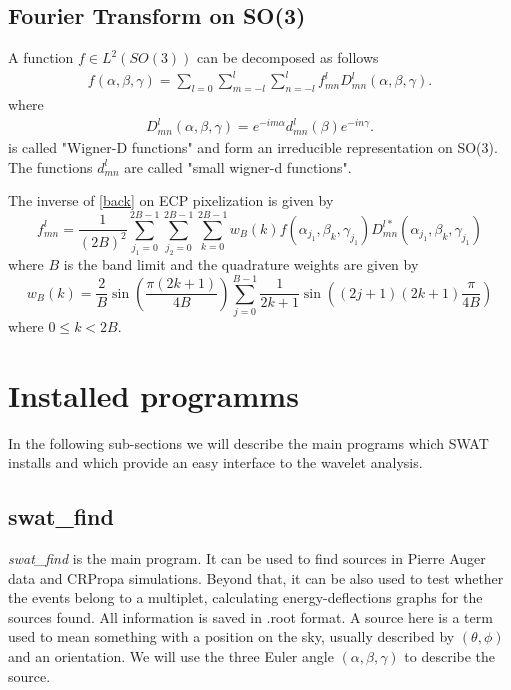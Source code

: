 \documentclass[12pt]{article}
\begin{document}
\subsection{Fourier Transform on SO(3)}
A function $f \in L^2(SO(3))$ can be decomposed as follows
\begin{eqnarray}
f(\alpha,\beta,\gamma) = \sum_{l = 0}\sum_{m = -l}^l\sum_{n = -l}^l f^l_{mn}D^l_{mn}(\alpha,\beta,\gamma).
\label{back}
\end{eqnarray}
where
\begin{eqnarray}
D^l_{mn}(\alpha,\beta,\gamma) = e^{-im\alpha}d^l_{mn}(\beta)e^{-in\gamma}.
\end{eqnarray}
is called "Wigner-D functions" and form an irreducible representation on SO(3). The
functions $d^l_{mn}$ are called "small wigner-d functions".

The inverse of \ref{back} on ECP pixelization is given by
\begin{equation}
f^l_{mn} = \frac{1}{(2B)^2}\sum_{j_1 = 0}^{2B - 1}\sum_{j_2 = 0}^{2B - 1}\sum_{k = 0}^{2B - 1}
w_B(k)f(\alpha_{j_1},\beta_{k},\gamma_{j_1})D^{l*}_{mn}(\alpha_{j_1},\beta_{k},\gamma_{j_1})
\end{equation}
where $B$ is the band limit and the quadrature weights are given by
\begin{equation}
w_B(k) = \frac{2}{B}\sin\left(\frac{\pi(2k + 1)}{4B}\right)\sum_{j = 0}^{B - 1}
\frac{1}{2k + 1}\sin\left((2j+1)(2k+1)\frac{\pi}{4B}\right)
\end{equation}
where $0\le k < 2B$. 

\section{Installed programms}

In the following sub-sections we will describe the main programs which 
SWAT installs and which provide an easy interface to the wavelet analysis.

\subsection{swat\_find}

{\it swat\_find} is the main program. It can be used to find sources in Pierre
Auger data and CRPropa simulations. Beyond that, it can be also used to test
whether the events belong to a multiplet, calculating energy-deflections graphs
for the sources found. All information is saved in .root format. A source here
is a term used to mean something with a position on the sky, usually described
by $(\theta,\phi)$ and an orientation. We will use the three Euler angle
$(\alpha,\beta,\gamma)$ to describe the source. 
\end{document}
